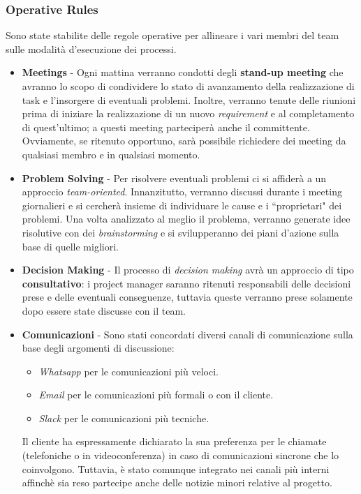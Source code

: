 \subsubsection{Operative Rules}
\label{sec:planning-operative-rules}
Sono state stabilite delle regole operative per allineare i vari membri del team sulle modalità d'esecuzione dei processi.
\begin{itemize}
    \item \textbf{Meetings} - Ogni mattina verranno condotti degli \textbf{stand-up meeting} che avranno lo scopo di condividere lo stato di avanzamento della realizzazione di task e l'insorgere di eventuali problemi. Inoltre, verranno tenute delle riunioni prima di iniziare la realizzazione di un nuovo \textit{requirement} e al completamento di quest'ultimo; a questi meeting parteciperà anche il committente. Ovviamente, se ritenuto opportuno, sarà possibile richiedere dei meeting da qualsiasi membro e in qualsiasi momento.
    \item \textbf{Problem Solving} - Per risolvere eventuali problemi ci si affiderà a un approccio \textit{team-oriented}. Innanzitutto, verranno discussi durante i meeting giornalieri e si cercherà insieme di individuare le cause e i ``proprietari" dei problemi. Una volta analizzato al meglio il problema, verranno generate idee risolutive con dei \textit{brainstorming} e si svilupperanno dei piani d'azione sulla base di quelle migliori.
    \item \textbf{Decision Making} - Il processo di \textit{decision making} avrà un approccio di tipo \textbf{consultativo}: i project manager saranno ritenuti responsabili delle decisioni prese e delle eventuali conseguenze, tuttavia queste verranno prese solamente dopo essere state discusse con il team.
    \item \textbf{Comunicazioni} - Sono stati concordati diversi canali di comunicazione sulla base degli argomenti di discussione:
    \begin{itemize}
        \item \textit{Whatsapp} per le comunicazioni più veloci.
        \item \textit{Email} per le comunicazioni più formali o con il cliente.
        \item \textit{Slack} per le comunicazioni più tecniche.
    \end{itemize}
    Il cliente ha espressamente dichiarato la sua preferenza per le chiamate (telefoniche o in videoconferenza) in caso di comunicazioni sincrone che lo coinvolgono. Tuttavia, è stato comunque integrato nei canali più interni affinchè sia reso partecipe anche delle notizie minori relative al progetto.
\end{itemize}

